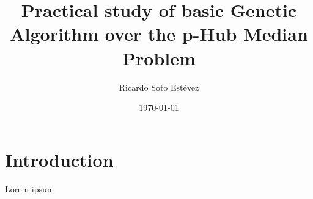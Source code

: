 \documentclass[12pt]{article}
\author{Ricardo Soto Estévez}
\date{\today}
\title{Practical study of basic Genetic Algorithm over the p-Hub Median Problem}
\begin{document}
\maketitle

\begin{abstract}
\end{abstract}

\section{Introduction}

Lorem ipsum

% 
\end{document}
